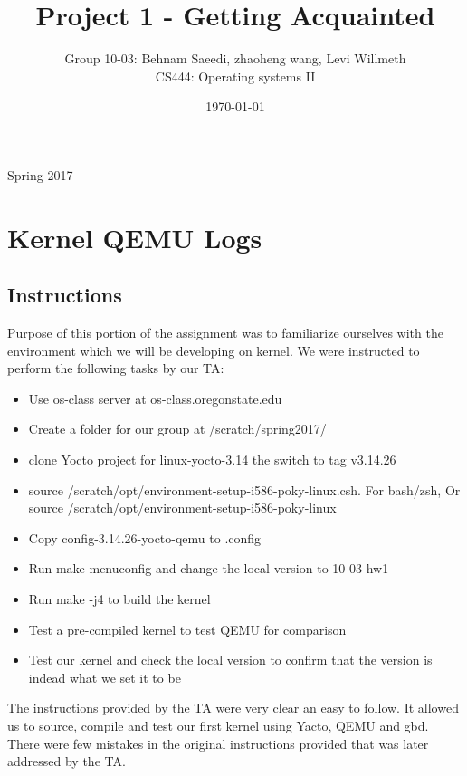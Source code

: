 \documentclass[journal,10pt,onecolumn,compsoc,letterpaper,draftclsnofoot,table,xcdraw]{IEEEtran} \usepackage[margin=0.75in]{geometry}
\title{Project 1 - Getting Acquainted}
\author{Group 10-03: Behnam Saeedi, zhaoheng wang, Levi Willmeth \\ CS444: Operating systems II}
\date{\today}
\begin{document}
\maketitle
\begin{centering}
Spring 2017
\begin{abstract}

\end{abstract}
\end{centering}
\newpage
\tableofcontents
\newpage 
\section{Kernel QEMU Logs}
\subsection{Instructions}
\noindent Purpose of this portion of the assignment was to familiarize ourselves with the environment which we will be developing on kernel. We were instructed to perform the following tasks by our TA:
\begin{itemize}
\item Use os-class server at os-class.oregonstate.edu
\item Create a folder for our group at /scratch/spring2017/
\item clone Yocto project for linux-yocto-3.14 the switch to tag v3.14.26 
\item source /scratch/opt/environment-setup-i586-poky-linux.csh. For bash/zsh, Or source /scratch/opt/environment-setup-i586-poky-linux 
\item Copy config-3.14.26-yocto-qemu to .config
\item Run make menuconfig and change the local version to-10-03-hw1
\item Run make -j4 to build the kernel
\item Test a pre-compiled kernel to test QEMU for comparison
\item Test our kernel and check the local version to confirm that the version is indead what we set it to be
\end{itemize}
\noindent The instructions provided by the TA were very clear an easy to follow. It allowed us to source, compile and test our first kernel using Yacto, QEMU and gbd. There were few mistakes in the original instructions provided that was later addressed by the TA.
\end{document}
